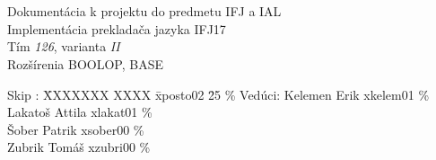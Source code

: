 \documentclass[a4paper, 12pt]{article}
\begin{document}
\begin{titlepage}

\begin{center}
\fontsize{25}{20}\\
\fontsize{21}{0}\textsc{\selectfont{Fakulta informačních technologií}}\\
\begin{figure}[ht]
    \begin{center}
    \end{center}
\end{figure}

\LARGE{Dokumentácia k projektu do predmetu IFJ a IAL}\\
\Large{Implementácia prekladača jazyka IFJ17}\\ 
\bigskip
\Large{Tím \textit{126}, varianta \textit{II}}\\
\Large{Rozšírenia BOOLOP, BASE}
\end{center}

\begin{center}
\begin{large}
\begin{tabbing}
Skip   : \quad \quad \= XXXXXXX XXXX \quad \= xposto02 \quad \= 25 \%\kill
       Vedúci:  \> Kelemen Erik \> xkelem01  \% \\
   		     	\> Lakatoš Attila  \> xlakat01  \% \\
                \> Šober Patrik  \> xsober00  \% \\
                \> Zubrik Tomáš \> xzubri00  \% \\
\end{tabbing}
\end{large}
\end{center}

\end{titlepage}
\end{document}
